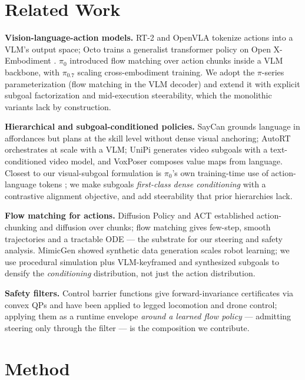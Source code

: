 \documentclass[conference,10pt]{IEEEtran}
\begin{document}
\section{Related Work}
\textbf{Vision-language-action models.} RT-2 \cite{rt2} and OpenVLA \cite{openvla} tokenize actions into a VLM's output space; Octo \cite{octo} trains a generalist transformer policy on Open X-Embodiment \cite{oxe}. $\pi_0$ \cite{pi0} introduced flow matching over action chunks inside a VLM backbone, with $\pi_0.7$ \cite{pi07} scaling cross-embodiment training. We adopt the $\pi$-series parameterization (flow matching in the VLM decoder) and extend it with explicit subgoal factorization and mid-execution steerability, which the monolithic variants lack by construction.

\textbf{Hierarchical and subgoal-conditioned policies.} SayCan \cite{saycan} grounds language in affordances but plans at the skill level without dense visual anchoring; AutoRT \cite{autort} orchestrates at scale with a VLM; UniPi \cite{unipi} generates video subgoals with a text-conditioned video model, and VoxPoser \cite{voxposer} composes value maps from language. Closest to our visual-subgoal formulation is $\pi_0$'s own training-time use of action-language tokens \cite{pi0}; we make subgoals \emph{first-class dense conditioning} with a contrastive alignment objective, and add steerability that prior hierarchies lack.

\textbf{Flow matching for actions.} Diffusion Policy \cite{diffusionpolicy} and ACT \cite{act} established action-chunking and diffusion over chunks; flow matching \cite{lipman,tong} gives few-step, smooth trajectories and a tractable ODE --- the substrate for our steering and safety analysis. MimicGen \cite{mimicgen} showed synthetic data generation scales robot learning; we use procedural simulation plus VLM-keyframed and synthesized subgoals to densify the \emph{conditioning} distribution, not just the action distribution.

\textbf{Safety filters.} Control barrier functions \cite{ames2014,ames2019} give forward-invariance certificates via convex QPs and have been applied to legged locomotion and drone control; applying them as a runtime envelope \emph{around a learned flow policy} --- admitting steering only through the filter --- is the composition we contribute.

\section{Method}
\label{sec:method}
\end{document}
